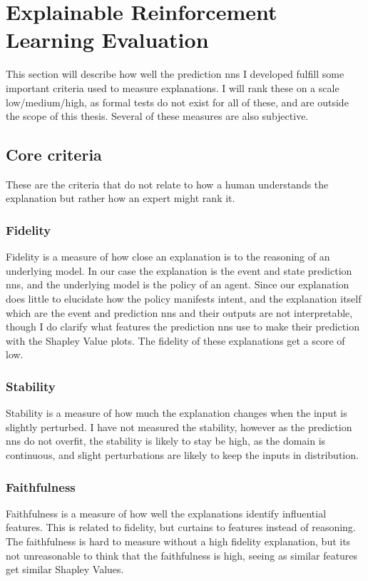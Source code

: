 \documentclass[UKenglish]{uiomasterthesis}
\begin{document}
\section{Explainable Reinforcement Learning Evaluation}
This section will describe how well the prediction \acp{nn} I developed fulfill some important criteria used to measure explanations. I will rank these on a scale low/medium/high, as formal tests do not exist for all of these, and are outside the scope of this thesis. Several of these measures are also subjective.

\subsection{Core criteria}
These are the criteria that do not relate to how a human understands the explanation but rather how an expert might rank it.

\subsubsection{Fidelity}
Fidelity is a measure of how close an explanation is to the reasoning of an underlying model. In our case the explanation is the event and state prediction \acp{nn}, and the underlying model is the policy of an agent. Since our explanation does little to elucidate how the policy manifests intent, and the explanation itself which are the event and prediction \acp{nn} and their outputs are not interpretable, though I do clarify what features the prediction \acp{nn} use to make their prediction with the Shapley Value plots. The fidelity of these explanations get a score of low.

\subsubsection{Stability}
Stability is a measure of how much the explanation changes when the input is slightly perturbed. I have not measured the stability, however as the prediction \acp{nn} do not overfit, the stability is likely to stay be high, as the domain is continuous, and slight perturbations are likely to keep the inputs in distribution.

\subsubsection{Faithfulness}
Faithfulness is a measure of how well the explanations identify influential features. This is related to fidelity, but curtains to features instead of reasoning. The faithfulness is hard to measure without a high fidelity explanation, but its not unreasonable to think that the faithfulness is high, seeing as similar features get similar Shapley Values.
\end{document}
